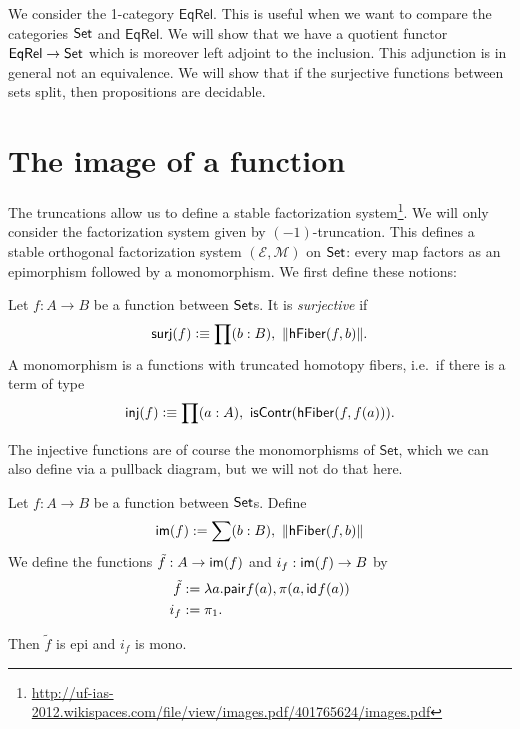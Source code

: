 We consider the 1-category $\mathsf{EqRel}$. 
This is useful when we want to compare the categories $\mathsf{Set}$ and $\mathsf{EqRel}$. We will show that we have
a quotient functor $\mathsf{EqRel}\to\mathsf{Set}$ which is moreover left
adjoint to the inclusion. This adjunction is in general not an equivalence. We will show that if the
surjective functions between sets split, then propositions are decidable.

\section{The image of a function}
The truncations allow us to define a stable factorization
system\footnote{\url{http://uf-ias-2012.wikispaces.com/file/view/images.pdf/401765624/images.pdf}}.
We will only consider the factorization system given by $(-1)$-truncation.
This defines a stable orthogonal factorization system $(\mathcal{E},
\mathcal{M})$ on $\mathsf{Set}$: every map factors as an epimorphism followed by a monomorphism.
We first define these notions:
\begin{defn}
Let $f:A\to B$ be a function between $\mathsf{Set}$s. It is \emph{surjective} if
\begin{equation*}
\mathsf{surj}(f)\defeq\prod(b:B),\ \|\hfiber{f}b\|.
\end{equation*}
A monomorphism is a functions with truncated homotopy fibers, i.e.\ if there is a term of type
\begin{equation*}
\mathsf{inj}(f)\defeq\prod(a:A),\ \mathsf{isContr}(\hfiber{f}{f(a)}).
\end{equation*}
\end{defn}

The injective functions are of course the monomorphisms of
$\mathsf{Set}$, which we can also define via a pullback diagram, but we will not do that here.

\begin{defn}
Let $f:A\to B$ be a function between $\mathsf{Set}$s. Define
\begin{equation*}
\im(f):=\sum(b:B),\ \|\hfiber{f}b\|
\end{equation*}
We define the functions $\tilde{f}:A\to\mathsf{im}(f)$ and $i_f:\mathsf{im}(f)\to B$ by
\begin{align*}
\tilde{f} & := \lambda a.\mathsf{pair}{f(a),\pi(a,\mathsf{id}_{}{f(a)})}\\
i_f & := \pi_1.
\end{align*}
\end{defn}

\begin{lem}
Then $\tilde{f}$ is epi and $i_f$ is mono.
\end{lem}

